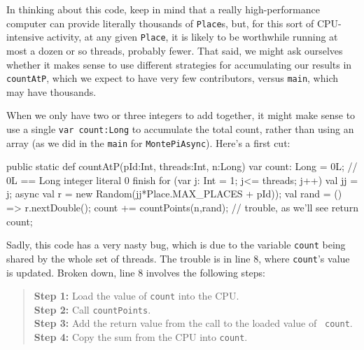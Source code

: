 In thinking about this code, keep in mind that a really high-performance computer
can provide literally thousands of {\tt Place}s, but,
for this sort of CPU-intensive activity, at any given {\tt Place}, it is likely
to be worthwhile running at most a dozen or so threads, probably fewer.  That
said, we might ask ourselves whether it makes sense to use different strategies
for accumulating our results in {\tt countAtP},  which we expect to have very
few contributors, versus {\tt main}, which may have thousands.

When we only have two or three integers to add together, it might make sense to
use a single {\tt var count:Long} to accumulate the total count, rather than using
an array (as we did in the {\tt main} for {\tt MontePiAsync}).
Here's a first cut:
\begin{xtennum}
public static def countAtP(pId:Int, threads:Int, n:Long) {
   var count: Long = 0L;  // 0L == Long integer literal 0
   finish for (var j: Int = 1; j<= threads; j++)  {
      val jj = j;
      async {
         val r = new Random(jj*Place.MAX_PLACES + pId));
         val rand = () => r.nextDouble();
         count +=  countPoints(n,rand); // trouble, as we'll see
      }
   }
   return count;
}
\end{xtennum}
Sadly, this code has a very nasty bug, which is due to the variable
{\tt count} being shared by the whole set of threads.
The trouble is in line 8, where {\tt count}'s value is updated.  Broken
down, line 8 involves the following steps:
\begin{quote}
  {\bf Step 1: } Load the value of {\tt count} into the CPU.\\
  {\bf Step 2: } Call {\tt countPoints}.\\
  {\bf Step 3: } Add the return value from the call to the loaded value of {\tt
  count}.\\
  {\bf Step 4: } Copy the sum from the CPU into {\tt count}.
\end{quote}

